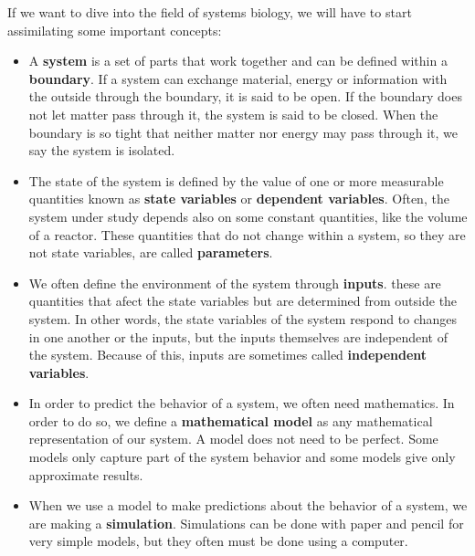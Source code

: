 \documentclass{tufte-book} %
\begin{document}
If we want to dive into the field of systems biology, we will have to start assimilating some important concepts: 
\begin{itemize}
	\item A \textbf{system} is a set of parts that work together and can be defined within a \textbf{boundary}. If a system can exchange material, energy or information with the outside through the boundary, it is said to be open. If the boundary does not let matter pass through it, the system is said to be closed. When the boundary is so tight that neither matter nor energy may pass through it, we say the system is isolated.
	\item The state of the system is defined by the value of one or more measurable quantities known as \textbf{state variables} or \textbf{dependent variables}. Often, the system under study depends also on some constant quantities, like the volume of a reactor. These quantities that do not change within a system, so they are not state variables, are called \textbf{parameters}.
	\item We often define the environment of the system through \textbf{inputs}. these are quantities that afect the state variables but are determined from outside the system. In other words, the state variables of the system respond to changes in one another or the inputs, but the inputs themselves are independent of the system. Because of this, inputs are sometimes called  \textbf{independent variables}.
	\item In order to predict the behavior of a system, we often need mathematics. In order to do so, we define a \textbf{mathematical model} as any mathematical representation of our system. A model does not need to be perfect. Some models only capture part of the system behavior and some models give only  approximate results.
	\item When we use a model to make predictions about the behavior of a system, we are making a \textbf{simulation}. Simulations can be done with paper and pencil for very simple models, but they often must be done using a computer.
\end{itemize}
\end{document}
